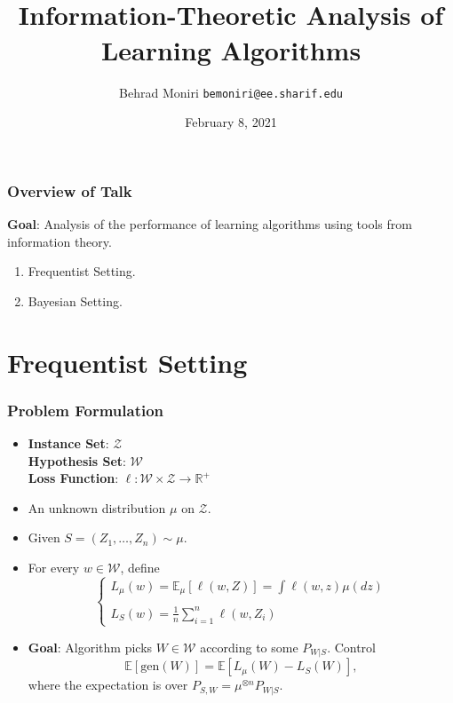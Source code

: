 \documentclass[usenames,dvipsnames, 10pt]{beamer}
\title[Information-Theoretic Analysis of Learning Algorithms]{‌\vspace{0.5cm}\\
Information-Theoretic Analysis of Learning Algorithms}
\author[Behrad ]{
  Behrad Moniri
  \pdfnewline
  \texttt{bemoniri@ee.sharif.edu}
}
\institute{\small{EE Department - Sharif University of Technology}}
\date{February 8, 2021}
\newcommand{\R}{\mathbb{R}}
\newcommand{\E}{\mathbb{E}}
\begin{document}
\begin{frame}
\titlepage
\end{frame}

\begin{frame}
	\frametitle{Overview of Talk}
	
	\textbf{Goal}: Analysis of the performance of learning algorithms using tools from information theory.
	\pause
	
	\vspace{1cm}
	\begin{enumerate}
		\item Frequentist Setting.
		\item Bayesian Setting.
	\end{enumerate}
\end{frame}

\section{Frequentist Setting}



\begin{frame}
	\frametitle{Problem Formulation}
	
	\begin{itemize}
		\item 
		
		
		\textbf{Instance Set}: $\mathcal{Z}$ \\ \textbf{Hypothesis Set}: $\mathcal{W}$ \\
		\textbf{Loss Function}:
		$\ell: \mathcal{W}\times \mathcal{Z} \to \R^+$
		
		\pause
		\item An unknown distribution  $\mu$ on $\mathcal{Z}$.			
		
		\pause
		\item Given $S = (Z_1, \dots, Z_n)\sim \mu$.
		
		
		\pause
		\item For every $w \in \mathcal{W}$, define
		\begin{equation*}
		\begin{cases}
			L_\mu(w) = \E_\mu[\ell(w, Z)] = \int \ell(w, z) \mu(dz)\\
			\\
			L_S(w) = \frac{1}{n}\sum_{i = 1}^{n} \ell(w, Z_i)
		\end{cases}
		\end{equation*}
	
		\pause
		\item \textbf{Goal}:  Algorithm picks $W \in \mathcal{W}$ according to some $P_{W|S}$. Control
			\begin{equation*}
				\E [\mathrm{gen}(W)] =  \E [L_\mu(W) - L_S(W)],
			\end{equation*}
			where the expectation is over $P_{S, W} = \mu^{\otimes n}  P_{W|S}$.		
	\end{itemize}
	
\end{frame}
\end{document}
